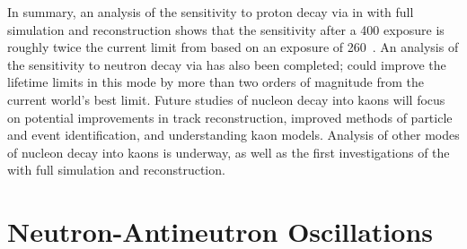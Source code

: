 In summary, an analysis of the sensitivity to proton decay via \ptoknubar in  with full simulation and reconstruction shows that the sensitivity after a \SI{400}{\ktyr} exposure
is roughly twice the current limit from \superk based on an exposure of \SI{260}{\ktyr}~\cite{Abe:2014mwa}.  
An analysis of the sensitivity to neutron decay via \ntoek has also been completed;  could improve the lifetime limits in this mode by more than two orders of magnitude from the current world's best limit.  Future studies of nucleon decay into kaons will focus on potential improvements in track reconstruction, improved methods of particle and event identification, and understanding kaon  models.  
Analysis of other modes of nucleon decay into kaons is underway, as well as the first investigations of the \ptoepizero with full simulation and reconstruction.



\section{Neutron-Antineutron Oscillations}
\label{sec:nonaccel-nnbar}

